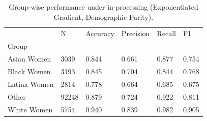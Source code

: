 \begin{table}[htbp]
\centering
\caption{Group-wise performance under in-processing (Exponentiated Gradient, Demographic Parity).}
\label{tab:11-inproc-group-metrics}
\begin{tabular}{llllll}
\toprule
 & N & Accuracy & Precision & Recall & F1 \\
Group &  &  &  &  &  \\
\midrule
Asian Women & 3039 & 0.844 & 0.661 & 0.877 & 0.754 \\
Black Women & 3193 & 0.845 & 0.704 & 0.844 & 0.768 \\
Latina Women & 2814 & 0.778 & 0.664 & 0.685 & 0.675 \\
Other & 92248 & 0.879 & 0.724 & 0.922 & 0.811 \\
White Women & 5754 & 0.940 & 0.839 & 0.982 & 0.905 \\
\bottomrule
\end{tabular}

\end{table}